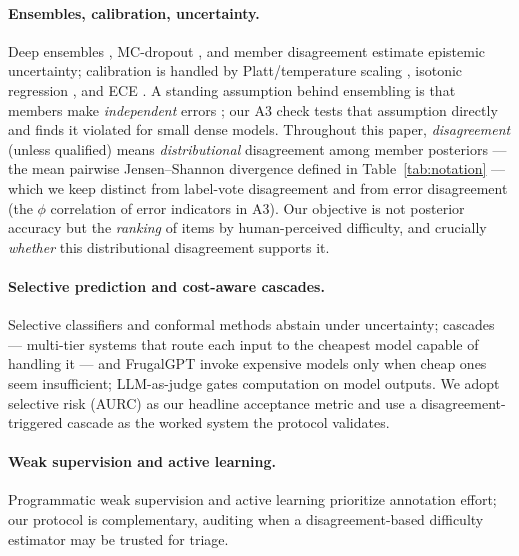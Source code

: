 \documentclass[letterpaper]{article} %
\begin{document}
\paragraph{Ensembles, calibration, uncertainty.}
Deep ensembles \citep{lakshminarayanan2017simple}, MC-dropout
\citep{gal2016dropout}, and member disagreement \citep{kendall2017uncertainties}
estimate epistemic uncertainty; calibration is handled by Platt/temperature
scaling \citep{guo2017calibration, platt1999probabilistic}, isotonic regression
\citep{zadrozny2002transforming}, and ECE \citep{naeini2015obtaining}. A standing
assumption behind ensembling is that members make \emph{independent} errors
\citep{dietterich2000ensemble}; our
A3 check tests that assumption directly and finds it violated for small dense
models. Throughout this paper, \emph{disagreement} (unless qualified) means
\emph{distributional} disagreement among member posteriors --- the mean pairwise
Jensen--Shannon divergence defined in Table~\ref{tab:notation} --- which we keep
distinct from label-vote disagreement and from error disagreement (the $\phi$
correlation of error indicators in A3). Our objective is not posterior accuracy
but the \emph{ranking} of items by human-perceived difficulty, and crucially
\emph{whether} this distributional disagreement supports it.

\paragraph{Selective prediction and cost-aware cascades.}
Selective classifiers \citep{geifman2017selective, hendrycks2017baseline} and
conformal methods \citep{angelopoulos2021gentle} abstain under uncertainty;
cascades --- multi-tier systems that route each input to the cheapest model capable of handling it \citep{viola2001rapid} --- and FrugalGPT \citep{chen2023frugalgpt} invoke
expensive models only when cheap ones seem insufficient; LLM-as-judge
\citep{zheng2023judging} gates computation on model outputs. We adopt selective
risk (AURC) as our headline acceptance metric and use a disagreement-triggered
cascade as the worked system the protocol validates.

\paragraph{Weak supervision and active learning.}
Programmatic weak supervision \citep{ratner2017snorkel} and active learning
\citep{settles2009active} prioritize annotation effort; our protocol is
complementary, auditing when a disagreement-based difficulty estimator may be
trusted for triage.
\end{document}
